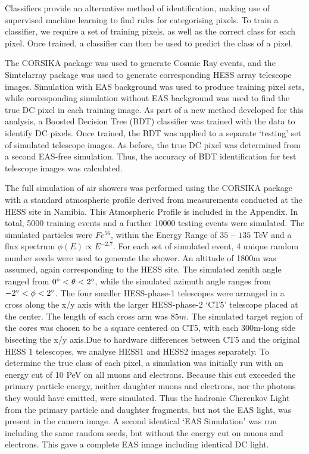 \documentclass[11pt]{article}
\begin{document}
Classifiers provide an alternative method of identification, making use of supervised machine learning to find rules for categorising pixels. To train a classifier, we require a set of training pixels, as well as the correct class for each pixel. Once trained, a classifier can then be used to predict the class of a pixel.

The CORSIKA package \cite{Heck98} was used to generate Cosmic Ray events, and the Sim\textunderscore telarray package  \cite{Bernlohr08} was used to generate corresponding HESS array telescope images.  Simulation with EAS background was used to produce training pixel sets, while corresponding simulation without EAS background was used to find the true DC pixel in each training image. As part of a new method developed for this analysis, a Boosted Decision Tree (BDT) classifier was trained with the data to identify DC pixels. Once trained, the BDT was applied to a separate \textquoteleft testing' set of simulated telescope images. As before, the true DC pixel was determined from a second EAS-free simulation. Thus, the accuracy of BDT identification for test telescope images was calculated.

The full simulation of air showers was performed using the CORSIKA package with a standard atmospheric profile derived from measurements conducted at the HESS site in Namibia. This Atmospheric Profile is included in the Appendix. In total, 5000 training events and a further 10000 testing events were simulated. The simulated particles were $Fe^{56}$, within the Energy Range of $35-135$ TeV and a flux spectrum $\phi(E) \propto E^{-2.7}$. For each set of simulated event, 4 unique random number seeds were used to generate the shower. An altitude of 1800m was assumed, again corresponding to the HESS site. The simulated zenith angle ranged from $0\degree < \theta < 2 \degree$, while the simulated azimuth angle ranges from $-2\degree < \phi < 2 \degree$. The four smaller HESS-phase-1 telescopes were arranged in a cross along the x/y axis with the larger HESS-phase-2 \textquoteleft CT5' telescope placed at the center. The length of each cross arm was $85m$. The simulated target region of the cores was chosen to be a square centered on CT5, with each 300m-long side bisecting the x/y axis.Due to hardware differences between CT5 and the original HESS 1 telescopes, we analyse HESS1 and HESS2 images separately. To determine the true class of each pixel, a simulation was initially run with an energy cut of 10 PeV on all muons and electrons. Because this cut exceeded the primary particle energy, neither daughter muons and electrons, nor the photons they would have emitted, were simulated. Thus the hadronic Cherenkov Light from the primary particle and daughter fragments, but not the EAS light, was present in the camera image. A second identical \textquoteleft EAS Simulation' was run including the same random seeds, but without the energy cut on muons and electrons. This gave a complete EAS image including identical DC light.
\end{document}
